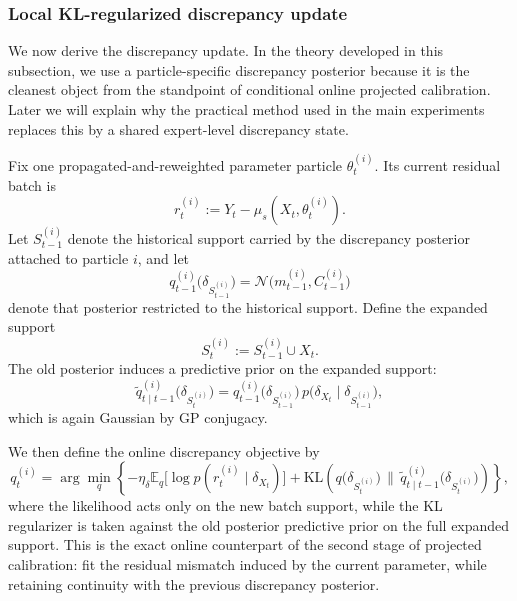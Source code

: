 \documentclass{article}
\begin{document}
\subsubsection{Local KL-regularized discrepancy update}
\label{sec:delta_kl_update}

We now derive the discrepancy update. In the theory developed in this subsection, we use a particle-specific discrepancy posterior because it is the cleanest object from the standpoint of conditional online projected calibration. Later we will explain why the practical method used in the main experiments replaces this by a shared expert-level discrepancy state.

Fix one propagated-and-reweighted parameter particle $\theta_t^{(i)}$. Its current residual batch is
\begin{equation}
r_t^{(i)}
:=
Y_t-\mu_s(X_t,\theta_t^{(i)}).
\label{eq:particle_residual_batch}
\end{equation}
Let $S_{t-1}^{(i)}$ denote the historical support carried by the discrepancy posterior attached to particle $i$, and let
\begin{equation}
q_{t-1}^{(i)}\!\big(\delta_{S_{t-1}^{(i)}}\big)
=
\mathcal N\!\big(m_{t-1}^{(i)}, C_{t-1}^{(i)}\big)
\label{eq:particle_old_delta_posterior}
\end{equation}
denote that posterior restricted to the historical support. Define the expanded support
\begin{equation}
S_t^{(i)} := S_{t-1}^{(i)} \cup X_t.
\label{eq:expanded_support}
\end{equation}
The old posterior induces a predictive prior on the expanded support:
\begin{equation}
\widetilde q_{t\mid t-1}^{(i)}\!\big(\delta_{S_t^{(i)}}\big)
=
q_{t-1}^{(i)}\!\big(\delta_{S_{t-1}^{(i)}}\big)\,
p\!\big(\delta_{X_t}\mid \delta_{S_{t-1}^{(i)}}\big),
\label{eq:delta_predictive_prior}
\end{equation}
which is again Gaussian by GP conjugacy.

We then define the online discrepancy objective by
\begin{equation}
q_t^{(i)}
=
\arg\min_q
\left\{
-\eta_\delta
\mathbb E_q
\big[
\log p(r_t^{(i)}\mid \delta_{X_t})
\big]
+
\mathrm{KL}\!\left(
q\!\big(\delta_{S_t^{(i)}}\big)
\,\|\, 
\widetilde q_{t\mid t-1}^{(i)}\!\big(\delta_{S_t^{(i)}}\big)
\right)
\right\},
\label{eq:delta_online_objective}
\end{equation}
where the likelihood acts only on the new batch support, while the KL regularizer is taken against the old posterior predictive prior on the full expanded support. This is the exact online counterpart of the second stage of projected calibration: fit the residual mismatch induced by the current parameter, while retaining continuity with the previous discrepancy posterior.
\end{document}
